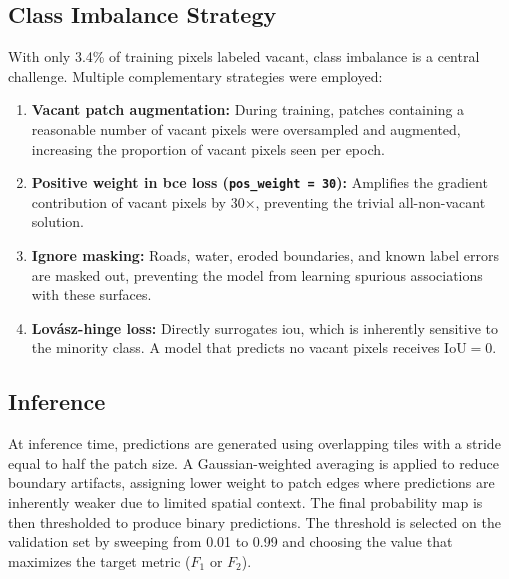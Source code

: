 \subsection{Class Imbalance Strategy}
\label{sec:class_imbalance}

With only 3.4\% of training pixels labeled vacant, class imbalance is a central challenge. Multiple complementary strategies were employed:

\begin{enumerate}
  \item \textbf{Vacant patch augmentation:} During training, patches containing a reasonable number of vacant pixels were oversampled and augmented, increasing the proportion of vacant pixels seen per epoch.
  \item \textbf{Positive weight in \acrshort{bce} loss (\texttt{pos\_weight\,=\,30}):} Amplifies the gradient contribution of vacant pixels by 30$\times$, preventing the trivial all-non-vacant solution.
  \item \textbf{Ignore masking:} Roads, water, eroded boundaries, and known label errors are masked out, preventing the model from learning spurious associations with these surfaces.
  \item \textbf{Lov\'{a}sz-hinge loss:} Directly surrogates \acrshort{iou}, which is inherently sensitive to the minority class. A model that predicts no vacant pixels receives $\text{IoU} = 0$.
\end{enumerate}

\subsection{Inference}
\label{sec:inference}

At inference time, predictions are generated using overlapping tiles with a stride equal to half the patch size. A Gaussian-weighted averaging is applied to reduce boundary artifacts, assigning lower weight to patch edges where predictions are inherently weaker due to limited spatial context. The final probability map is then thresholded to produce binary predictions. The threshold is selected on the validation set by sweeping from 0.01 to 0.99 and choosing the value that maximizes the target metric ($F_1$ or $F_2$).
